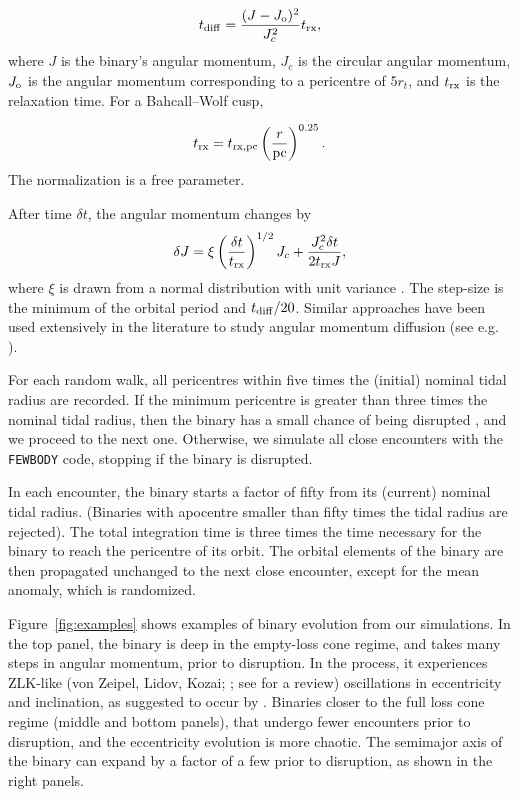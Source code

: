 \documentclass[fleqn,usenatbib]{mnras}
\begin{document}
\begin{equation}
    t_{\rm diff}=\frac{(J-J_{\rm o})^2}{J_c^2} t_{\rm rx},
\end{equation}
where $J$ is the binary's angular momentum, $J_c$ is the circular angular momentum, $J_{\rm o}$ is the angular momentum corresponding to a pericentre of $5 r_t$, and $t_{\rm rx}$ is the relaxation time. For a Bahcall--Wolf cusp,

\begin{equation}
    t_{\rm rx}=t_{\rm rx,pc} \left (\frac{r}{\rm pc}\right)^{0.25}.
\end{equation}
The normalization is a free parameter.


After time $\delta t$, the angular momentum changes by 
\begin{equation}
    \delta J=\xi \left(\frac{\delta t}{t_{\rm rx}}\right)^{1/2} J_c+ \frac{J_c^2 \delta t}{2 t_{\rm rx} J}, 
\end{equation}
where $\xi$ is drawn from a normal distribution with unit variance \citep{risken1989}. The step-size is the minimum of the orbital period and 
$t_{\rm diff}/20$. Similar approaches have been used extensively in the literature to study angular momentum diffusion (see e.g. \citealt{hopman&alexander2005, bar-or&alexander2016,wenbinlu+2020,tep+2021}).

For each random walk, all pericentres within five times the (initial) nominal tidal radius are recorded.
If the minimum pericentre is greater than three times the nominal tidal radius, then the binary has a small chance of being disrupted 
\citep{hills1991,bromley+2006,sari+2010, generozov&madigan2020}, and we proceed to the next one.
Otherwise, we simulate all close encounters with the \texttt{FEWBODY} code, stopping if the binary is disrupted. 

In each encounter, the binary starts a factor of fifty from its (current) nominal tidal radius. (Binaries with apocentre smaller than fifty times the tidal radius are rejected). The total integration time is three times the time necessary for the binary to reach the pericentre of its orbit. 
The orbital elements of the binary are then propagated unchanged to the next close encounter, except for the mean anomaly, which is randomized.

Figure~\ref{fig:examples} shows examples of binary evolution from our simulations. In the top panel, the binary is deep in the empty-loss cone regime, and takes many steps in angular momentum, prior to disruption. In the process, it experiences ZLK-like (von Zeipel, Lidov, Kozai; \citealt{lidov1962, kozai1962}; see \citealt{naoz2016} for a review) oscillations in eccentricity and inclination, as suggested to occur by \cite{antonini&perets2012}. Binaries closer to the full loss cone regime (middle and bottom panels), that undergo fewer encounters prior to disruption, and the eccentricity evolution is more chaotic. The semimajor axis of the binary can expand by a factor of a few prior to disruption, as shown in the right panels. 
\end{document}
